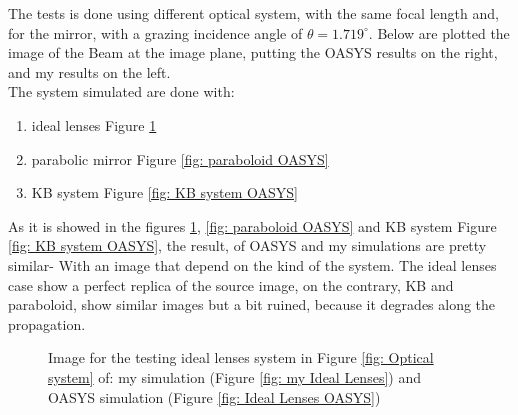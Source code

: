 %
The tests is done using different optical system, with the same focal length and, for the mirror, with a grazing incidence angle of $\theta = 1.719^{\circ}$. Below are plotted the image of the Beam at the image plane, putting the OASYS results on the right, and my results on the left. 
\\
The system simulated are done with:
\begin{enumerate}
\item ideal lenses Figure \ref{fig: Ideal lense OASYS}
\item parabolic mirror Figure \ref{fig: paraboloid OASYS}
\item KB system Figure \ref{fig: KB system OASYS}
\end{enumerate} 
\noindent As it is showed in the figures \ref{fig: Ideal lense OASYS}, \ref{fig: paraboloid OASYS} and KB system Figure \ref{fig: KB system OASYS}, the result, of OASYS and my simulations are pretty similar- With an image that depend on the kind of the system. The ideal lenses case show a perfect replica of the source image, on the contrary, KB and paraboloid, show similar images but a bit ruined, because it degrades along the propagation.
\newpage
%
\begin{figure}[H]
%
\centering
%
%
%
\caption{Image for the testing ideal lenses system in Figure \ref{fig: Optical system} of: my simulation (Figure \ref{fig: my Ideal Lenses}) and OASYS simulation (Figure \ref{fig: Ideal Lenses OASYS})}
%
\label{fig: Ideal lense OASYS}
%
\end{figure}
%
